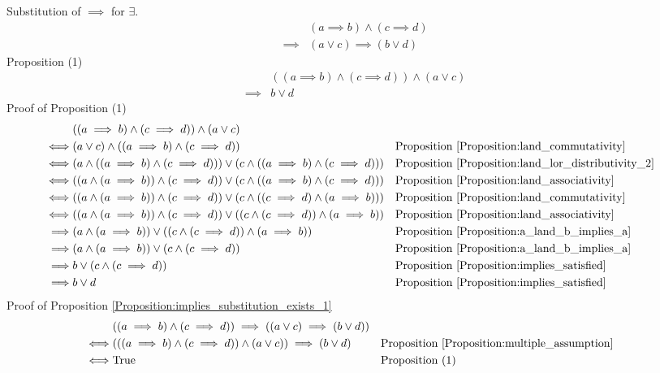 \begin{prop}
\label{Proposition:implies_substitution_exists_1}
Substitution of $\implies$ for $\exists$.
\begin{align*}
& (a \implies b) \land (c \implies d) \\
\implies & (a \lor c) \implies (b \lor d)
\end{align*}
Proposition (1)
\begin{align*}
& ((a \implies b) \land (c \implies d)) \land (a \lor c) \\
\implies & b \lor d
\end{align*}
Proof of Proposition (1)
\begin{align*}
& ((a \implies b) \land (c \implies d)) \land (a \lor c) \\
\iff & (a \lor c) \land ((a \implies b) \land (c \implies d))
& & \text{Proposition \ref{Proposition:land_commutativity}} \\
\iff & (a \land ((a \implies b) \land (c \implies d))) \lor (c \land ((a \implies b) \land (c \implies d)))
& & \text{Proposition \ref{Proposition:land_lor_distributivity_2}} \\
\iff & ((a \land (a \implies b)) \land (c \implies d)) \lor (c \land ((a \implies b) \land (c \implies d)))
& & \text{Proposition \ref{Proposition:land_associativity}} \\
\iff & ((a \land (a \implies b)) \land (c \implies d)) \lor (c \land ((c \implies d) \land (a \implies b)))
& & \text{Proposition \ref{Proposition:land_commutativity}} \\
\iff & ((a \land (a \implies b)) \land (c \implies d)) \lor ((c \land (c \implies d)) \land (a \implies b))
& & \text{Proposition \ref{Proposition:land_associativity}} \\
\implies & (a \land (a \implies b)) \lor ((c \land (c \implies d)) \land (a \implies b))
& & \text{Proposition \ref{Proposition:a_land_b_implies_a}} \\
\implies & (a \land (a \implies b)) \lor (c \land (c \implies d))
& & \text{Proposition \ref{Proposition:a_land_b_implies_a}} \\
\implies & b \lor (c \land (c \implies d))
& & \text{Proposition \ref{Proposition:implies_satisfied}} \\
\implies & b \lor d
& & \text{Proposition \ref{Proposition:implies_satisfied}} \\
\end{align*}
Proof of Proposition \ref{Proposition:implies_substitution_exists_1}
\begin{align*}
& ((a \implies b) \land (c \implies d)) \implies ((a \lor c) \implies (b \lor d)) \\
\iff & (((a \implies b) \land (c \implies d)) \land (a \lor c)) \implies (b \lor d)
& & \text{Proposition \ref{Proposition:multiple_assumption}} \\
\iff & \text{True}
& & \text{Proposition (1)} \\
\end{align*}
\end{prop}

